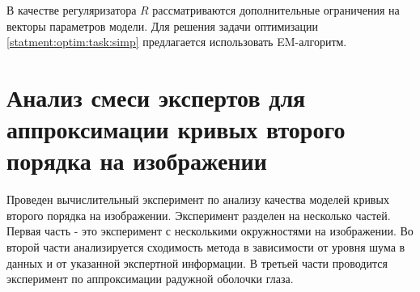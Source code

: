 В качестве регуляризатора $R$ рассматриваются дополнительные ограничения на векторы параметров модели. Для решения задачи оптимизации \eqref{statment:optim:task:simp} предлагается использовать EM-алгоритм.

\section{Анализ смеси экспертов для аппроксимации кривых второго порядка на изображении}
\label{sec:5}

Проведен вычислительный эксперимент по анализу качества моделей кривых второго порядка на изображении. Эксперимент разделен на несколько частей. Первая часть - это эксперимент с несколькими окружностями на изображении. Во второй части анализируется сходимость метода в зависимости от уровня шума в данных и от указанной экспертной информации. В третьей части проводится эксперимент по аппроксимации радужной оболочки глаза.

